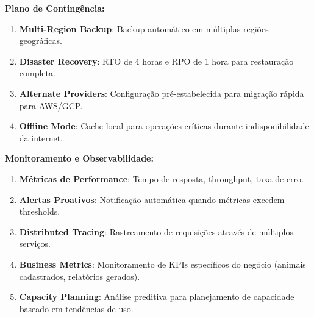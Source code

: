 \documentclass[12pt, a4paper]{article}
\begin{document}
\begin{spacing}{1.5}
\textbf{Plano de Contingência:}
\begin{enumerate}[label=\alph*)]
\item \textbf{Multi-Region Backup}: Backup automático em múltiplas regiões geográficas.
\item \textbf{Disaster Recovery}: RTO de 4 horas e RPO de 1 hora para restauração completa.
\item \textbf{Alternate Providers}: Configuração pré-estabelecida para migração rápida para AWS/GCP.
\item \textbf{Offline Mode}: Cache local para operações críticas durante indisponibilidade da internet.
\end{enumerate}

\textbf{Monitoramento e Observabilidade:}
\begin{enumerate}[label=\alph*)]
\item \textbf{Métricas de Performance}: Tempo de resposta, throughput, taxa de erro.
\item \textbf{Alertas Proativos}: Notificação automática quando métricas excedem thresholds.
\item \textbf{Distributed Tracing}: Rastreamento de requisições através de múltiplos serviços.
\item \textbf{Business Metrics}: Monitoramento de KPIs específicos do negócio (animais cadastrados, relatórios gerados).
\item \textbf{Capacity Planning}: Análise preditiva para planejamento de capacidade baseado em tendências de uso.
\end{enumerate}
\end{spacing}
\end{document}

